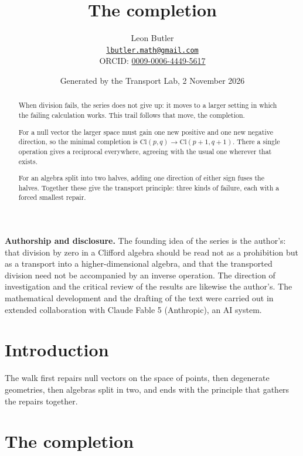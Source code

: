 \documentclass[11pt]{article}
\title{\bfseries The completion}
\author{Leon Butler\\ \normalsize\href{mailto:lbutler.math@gmail.com}{\texttt{lbutler.math@gmail.com}}\\ \normalsize ORCID: \href{https://orcid.org/0009-0006-4449-5617}{0009-0006-4449-5617}}
\date{Generated by the Transport Lab, 2 November 2026}
\theoremstyle{definition}
\theoremstyle{plain}
\providecommand{\Cl}{}\renewcommand{\Cl}{\mathrm{Cl}}
\begin{document}
\maketitle
\begin{abstract}
\normalsize
When division fails, the series does not give up: it moves to a larger setting in which the failing calculation works. This trail follows that move, the completion.

For a null vector the larger space must gain one new positive and one new negative direction, so the minimal completion is $\Cl(p,q) \to \Cl(p{+}1, q{+}1)$. There a single operation gives a reciprocal everywhere, agreeing with the usual one wherever that exists.

For an algebra split into two halves, adding one direction of either sign fuses the halves. Together these give the transport principle: three kinds of failure, each with a forced smallest repair.
\end{abstract}
\newpage
\noindent \textbf{Authorship and disclosure. }The founding idea of the series is the author's: that division by zero in a Clifford algebra should be read not as a prohibition but as a transport into a higher-dimensional algebra, and that the transported division need not be accompanied by an inverse operation. The direction of investigation and the critical review of the results are likewise the author's. The mathematical development and the drafting of the text were carried out in extended collaboration with Claude Fable 5 (Anthropic), an AI system.

\noindent{}
\newpage

\section*{Introduction}
The walk first repairs null vectors on the space of points, then degenerate geometries, then algebras split in two, and ends with the principle that gathers the repairs together.

\section{The completion}
\end{document}
